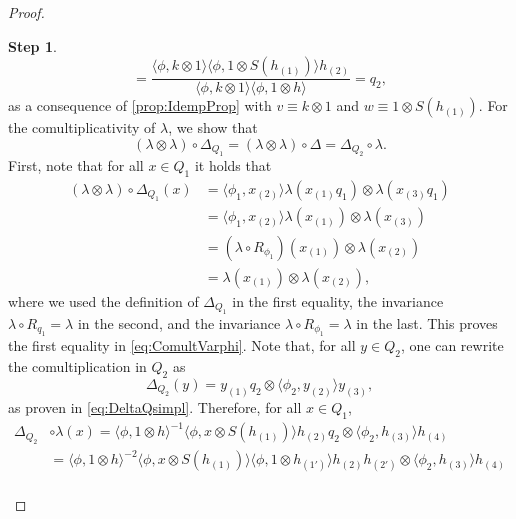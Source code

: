 \documentclass[a4paper,10pt]{amsart}
\newcommand{\eval}[2]{\langle #1 , #2\rangle}
\theoremstyle{definition}
\newtheorem{step-goursat}{Step}
\begin{document}
\begin{proof}
\begin{step-goursat}
\[        = \frac{\eval{\phi}{k\otimes 1}\eval{\phi}{1\otimes S(h_{(1)})}h_{(2)}}{\eval{\phi}{k\otimes 1} \eval{\phi}{1 \otimes h}}
        = q_2,
    \]
    as a consequence of \cref{prop:IdempProp} with $v\equiv k\otimes 1$ and $w\equiv 1\otimes S(h_{(1)})$.
    \smallbreak\noindent%
    For the comultiplicativity of $\lambda$, we show that 
    \begin{equation}\label{eq:ComultVarphi}
        (\lambda\otimes\lambda)\circ\Delta_{Q_1}
        = (\lambda\otimes\lambda)\circ\Delta
        = \Delta_{Q_2} \circ \lambda.
    \end{equation}
    First, note that for all $x\in Q_1$ it holds that
    \begin{align}
        (\lambda \otimes \lambda) \circ \Delta_{Q_1}(x) 
        &=
        \eval{\phi_1}{x_{(2)}} \lambda(x_{(1)}q_1) \otimes \lambda(x_{(3)}q_1)
        \\
        &=
        \eval{\phi_1}{x_{(2)}} \lambda(x_{(1)}) \otimes \lambda(x_{(3)})
        \\
        &=
        (\lambda \circ R_{\phi_1})(x_{(1)}) \otimes \lambda(x_{(2)})
        \\
        &=
        \lambda(x_{(1)})\otimes \lambda(x_{(2)}),
    \end{align}
    where we used the definition of $\Delta_{Q_1}$ in the first equality, the invariance $\lambda \circ R_{q_1}= \lambda$ in the second, and the invariance $\lambda \circ R_{\phi_1}= \lambda$ in the last. This proves the first equality in \cref{eq:ComultVarphi}.
    \smallbreak\noindent%
    Note that, for all $y\in Q_2$, one can rewrite the comultiplication in $Q_2$ as
    \begin{equation}\label{eq:equiv_comult_Q}
        \Delta_{Q_2}(y)
        =  y_{(1)} q_2 \otimes \eval{\phi_2}{y_{(2)}} y_{(3)},
    \end{equation}
    as proven in \cref{eq:DeltaQsimpl}.
    Therefore, for all $x\in Q_1$,
    \begin{align*}
        \Delta_{Q_2} &\circ \lambda(x) 
        =
            \eval{\phi}{1\otimes h}^{-1}
                \eval{\phi}{x \otimes S(h_{(1)})}
                        h_{(2)} q_2 \otimes  \eval{\phi_2}{h_{(3)}} h_{(4)}
        \\
        &=
            \eval{\phi}{1\otimes h}^{-2}
                \eval{\phi}{x \otimes S(h_{(1)})}
                        \eval{\phi}{1\otimes h_{(1')}}
                            h_{(2)} h_{(2')} \otimes \eval{\phi_2}{h_{(3)}} h_{(4)}
        \\

\end{align*}
\end{step-goursat}
\end{proof}
\end{document}
